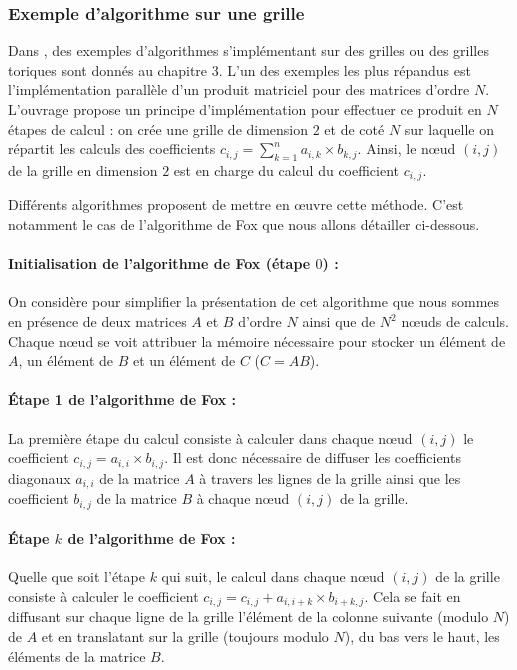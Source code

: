 \subsubsection{Exemple d'algorithme sur une grille}

Dans \cite{Leighton1992}, des exemples d'algorithmes s'implémentant sur des grilles ou des grilles toriques sont donnés au chapitre 3. L'un des exemples les plus répandus est l'implémentation parallèle d'un produit matriciel pour des matrices d'ordre $N$. L'ouvrage propose un principe d'implémentation pour effectuer ce produit en $N$ étapes de calcul : on crée une grille de dimension $2$ et de coté $N$ sur laquelle on répartit les calculs des coefficients $c_{i,j} = \sum\limits_{k=1}^n a_{i,k} \times b_{k,j}$. Ainsi, le nœud $(i,j)$ de la grille en dimension $2$ est en charge du calcul du coefficient $c_{i,j}$.

Différents algorithmes proposent de mettre en œuvre cette méthode. C'est notamment le cas de l'algorithme de Fox que nous allons détailler ci-dessous.

\paragraph{Initialisation de l'algorithme de Fox (étape $0$) :} On considère pour simplifier la présentation de cet algorithme que nous sommes en présence de deux matrices $A$ et $B$ d'ordre $N$ ainsi que de $N^2$ nœuds de calculs. Chaque nœud se voit attribuer la mémoire nécessaire pour stocker un élément de $A$, un élément de $B$ et un élément de $C$ ($C = AB$). 

\paragraph{Étape 1 de l'algorithme de Fox :} La première étape du calcul consiste à calculer dans chaque nœud $(i,j)$ le coefficient $c_{i,j} = a_{i,i}\times b_{i,j}$. Il est donc nécessaire de diffuser les coefficients diagonaux $a_{i,i}$ de la matrice $A$ à travers les lignes de la grille ainsi que les coefficient $b_{i,j}$ de la matrice $B$ à chaque nœud $(i,j)$ de la grille.

\paragraph{Étape $k$ de l'algorithme de Fox :} Quelle que soit l'étape $k$ qui suit, le calcul dans chaque nœud $(i,j)$ de la grille consiste à calculer le coefficient $c_{i,j} = c_{i,j} + a_{i,i+k}\times b_{i+k,j}$. Cela se fait en diffusant sur chaque ligne de la grille l'élément de la colonne suivante (modulo $N$) de $A$ et en translatant sur la grille (toujours modulo $N$), du bas vers le haut, les éléments de la matrice $B$.

